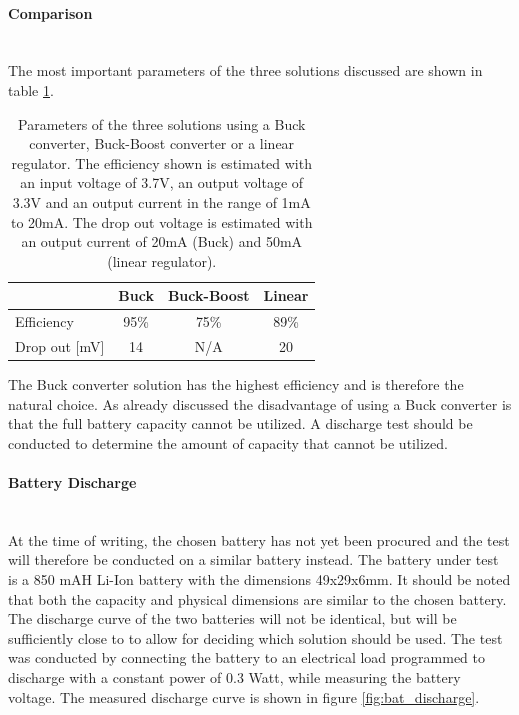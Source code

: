 \paragraph{Comparison}~\\
The most important parameters of the three solutions discussed are shown in table \ref{tab:vol_gen_joint}.

\begin{table}[h]
	\centering
	\begin{tabular}{l|c|c|c}
		  				&	Buck 	& Buck-Boost 	& Linear\\
		 \hline
		 Efficiency  	&  95\% 	& 75\%			&89\%		\\
		 Drop out [mV]		&14  	& N/A		&20		\\
	\end{tabular}
	\caption[Parameters of voltage generation solutions.]{Parameters of the three solutions using a Buck converter, Buck-Boost converter or a linear regulator. The efficiency shown is estimated with an input voltage of 3.7V, an output voltage of 3.3V and an output current in the range of 1mA to 20mA. The drop out voltage is estimated with an output current of 20mA (Buck) and 50mA (linear regulator).}
	\label{tab:vol_gen_joint}
\end{table}

The Buck converter solution has the highest efficiency and is therefore the natural choice.
As already discussed the disadvantage of using a Buck converter is that the full battery capacity cannot be utilized.
A discharge test should be conducted to determine the amount of capacity that cannot be utilized.


\paragraph{Battery Discharge}~\\
At the time of writing, the chosen battery has not yet been procured and the test will therefore be conducted on a similar battery instead.
The battery under test is a 850 mAH Li-Ion battery with the dimensions 49x29x6mm.
It should be noted that both the capacity and physical dimensions are similar to the chosen battery.
The discharge curve of the two batteries will not be identical, but will be sufficiently close to to allow for deciding which solution should be used.
The test was conducted by connecting the battery to an electrical load programmed to discharge with a constant power of 0.3 Watt, while measuring the battery voltage.
The measured discharge curve is shown in figure \ref{fig:bat_discharge}.

